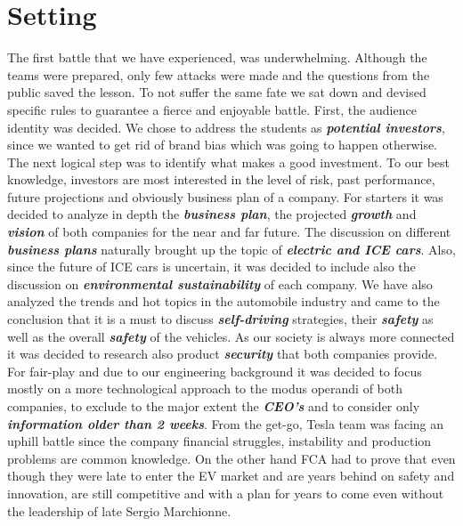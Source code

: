 \section{Setting} %
The first battle that we have experienced, was underwhelming. Although the teams were prepared, only few attacks were made and the questions from the public saved the lesson. To not suffer the same fate we sat down and devised specific rules to guarantee  a fierce and enjoyable battle.
First, the audience identity was decided. We chose to address the students as \textbf{\textit{potential investors}}, since we wanted to get rid of brand bias which was going to happen otherwise. The next logical step was to identify what makes a good investment.
To our best knowledge, investors are most interested in the level of risk, past performance, future projections and obviously business plan of a company.
For starters it was decided to analyze in depth the
\textbf{\textit{business plan}}, the projected \textbf{\textit{growth}} and \textbf{\textit{vision}} of both companies for the near and far future. 
The discussion on different \textbf{\textit{business plans}} naturally brought up the topic of \textbf{\textit{electric and ICE cars}}.
Also, since the future of ICE cars is uncertain, it was decided to include also the discussion on  \textbf{\textit{environmental sustainability}} of each company.
We have also analyzed the trends and hot topics in the automobile industry and came to the conclusion that it is a must to discuss \textbf{\textit{self-driving}} strategies, their \textbf{\textit{safety}} as well as the overall \textbf{\textit{safety}} of the vehicles.
As our society is always more connected it was decided to research also product \textbf{\textit{security}} that both companies provide.
\newline For fair-play and due to our engineering background it was decided to focus mostly on a more technological approach to the modus operandi of both companies, to exclude to the major extent the \textbf{\textit{CEO's}} and to consider only \textbf{\textit{information older than 2 weeks}}.
\newline From the get-go, Tesla team was facing an uphill battle since the company financial struggles, instability and production problems are common knowledge.
\newline On the other hand FCA had to prove that even though they were late to enter the EV market and are years behind on safety and innovation, are still competitive and with a plan for years to come even without the leadership of late Sergio Marchionne.


